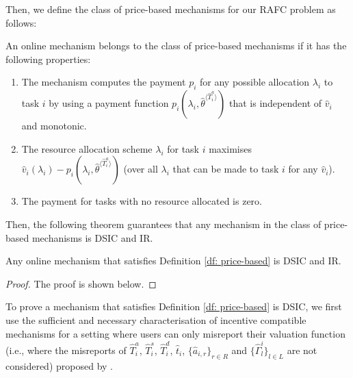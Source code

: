\documentclass[11pt]{phdthesis}
\begin{document}
Then, we define the class of price-based mechanisms for our RAFC problem as follows:

\begin{definition}\label{df: price-based}
    An online mechanism belongs to the class of price-based mechanisms if it has the following properties:
    \begin{enumerate}
        \item The mechanism computes the payment $ p_i$ for any possible allocation $ \lambda_i $ to task $i$ by using a payment function $p_i(\lambda_i, \hat{\theta}^{\langle \hat{T}_i^a \rangle})$ that is independent of $\hat{v}_i$ and monotonic.
        \item The resource allocation scheme $\lambda_i$ for task $ i $ maximises $ \hat{v}_i(\lambda_i) - p_i(\lambda_i, \hat{\theta}^{\langle \hat{T}_i^a \rangle})$ (over all $\lambda_i$ that can be made to task $i$ for any $\hat{v}_i$).
        \item The payment for tasks with no resource allocated is zero.
    \end{enumerate}
\end{definition}

Then, the following theorem guarantees that any mechanism in the class of price-based mechanisms is DSIC and IR.

\begin{theorem}\label{th: DSICandIR}
    Any online mechanism that satisfies Definition \ref{df: price-based} is DSIC and IR.
\end{theorem}

\begin{proof}
    The proof is shown below.
\end{proof}

To prove a mechanism that satisfies Definition \ref{df: price-based} is DSIC, we first use the sufficient and necessary characterisation of incentive compatible mechanisms for a setting where users can only misreport their valuation function (i.e., where the misreports of $\hat{T}_i^a$, $\hat{T}_i^s$, $\hat{T}_i^d$, $ \hat{t}_i $, $ \{ \hat{a}_{i,r} \}_{r \in R} $ and $ \{ \hat{\Gamma}_l^i \}_{l \in L} $ are not considered) proposed by \citet{bartal2003incentive} .
\end{document}

